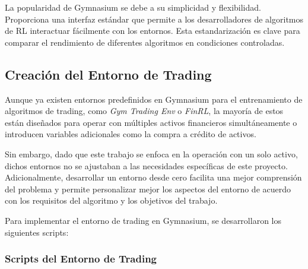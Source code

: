\documentclass[a4paper,12pt]{report}
\begin{document}
La popularidad de Gymnasium se debe a su simplicidad y flexibilidad. Proporciona una 
interfaz estándar que permite a los desarrolladores de algoritmos de RL interactuar 
fácilmente con los entornos. Esta estandarización es clave para comparar el rendimiento 
de diferentes algoritmos en condiciones controladas.

\subsection{Creación del Entorno de Trading}

Aunque ya existen entornos predefinidos en Gymnasium para el entrenamiento de algoritmos 
de trading, como \textit{Gym Trading Env} o \textit{FinRL}, la mayoría de estos están 
diseñados para operar con múltiples activos financieros simultáneamente o introducen variables adicionales
como la compra a crédito de activos. 

Sin embargo, dado que este trabajo se enfoca en la operación con un solo activo, dichos 
entornos no se ajustaban a las necesidades específicas de este proyecto. Adicionalmente, desarrollar 
un entorno desde cero facilita una mejor comprensión del problema y permite personalizar mejor los 
aspectos del entorno de acuerdo con los requisitos del algoritmo y los objetivos del trabajo.

Para implementar el entorno de trading en Gymnasium, se desarrollaron los siguientes scripts:

\subsubsection{Scripts del Entorno de Trading}
\end{document}
